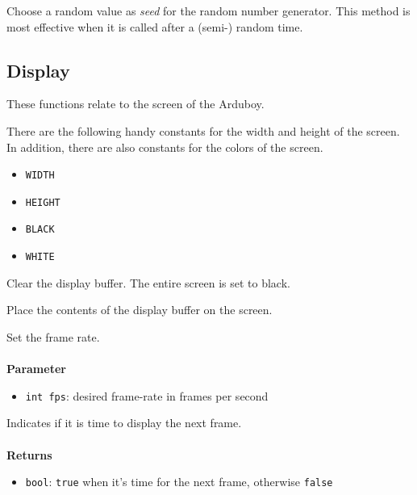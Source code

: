 \documentclass[11pt,fleqn]{book} %
\begin{document}
\begin{libf}[initRandomSeed()]
    Choose a random value as \emph{seed} for the random number generator. This method is most effective when it is called after a (semi-) random time.
\end{libf}

\subsection{Display}
These functions relate to the screen of the Arduboy.

\begin{libf}
	There are the following handy constants for the width and height of the screen. In addition, there are also constants for the colors of the screen.
	\begin{multicols}{2}
		\begin{itemize}
			\item \texttt{WIDTH}
			\item \texttt{HEIGHT}
			\item \texttt{BLACK}
			\item \texttt{WHITE}
		\end{itemize}
	\end{multicols}
\end{libf}

\begin{libf}[clear()]
	Clear the display buffer. The entire screen is set to black.
\end{libf}

\begin{libf}[display()]
	Place the contents of the display buffer on the screen.
\end{libf}

\begin{libf}
	Set the frame rate.\\ \\
	\textbf{Parameter}
	\begin{itemize}
		\item \texttt{int fps}: desired frame-rate in frames per second
	\end{itemize}
\end{libf}

\begin{libf}[nextFrame()]
	Indicates if it is time to display the next frame.\\ \\
	\textbf{Returns}
	\begin{itemize}
		\item \texttt{bool}: \texttt{true} when it's time for the next frame, otherwise \texttt{false}
	\end{itemize}
\end{libf}
\end{document}

